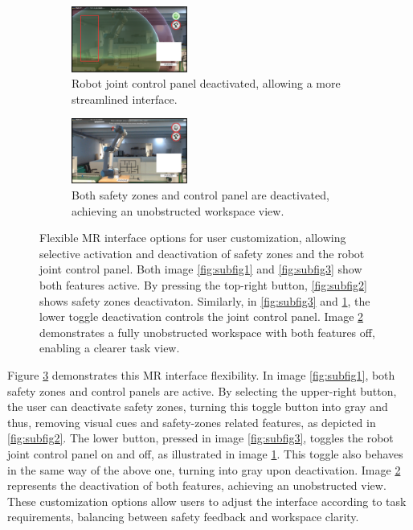 \begin{figure}[h]
    \vspace{0.5em}

    \begin{subfigure}{\textwidth}
        \centering
        \includegraphics[width=0.42\textwidth]{figs/feature-4.png}
        \caption{Robot joint control panel deactivated, allowing a more streamlined interface.}
        \label{fig:subfig4}
    \end{subfigure}

    \vspace{0.5em}

    \begin{subfigure}{\textwidth}
        \centering
        \includegraphics[width=0.42\textwidth]{figs/feature-5.png}
        \caption{Both safety zones and control panel are deactivated, achieving an unobstructed workspace view.}
        \label{fig:subfig5}
    \end{subfigure}

    \caption{Flexible \ac{MR} interface options for user customization, allowing selective activation and deactivation of safety zones and the robot joint control panel. Both image \ref{fig:subfig1} and \ref{fig:subfig3} show both features active. By pressing the top-right button, \ref{fig:subfig2} shows safety zones deactivaton. Similarly, in \ref{fig:subfig3} and \ref{fig:subfig4}, the lower toggle deactivation controls the joint control panel. Image \ref{fig:subfig5} demonstrates a fully unobstructed workspace with both features off, enabling a clearer task view.}
    \label{fig:all-features-button}
\end{figure}


Figure \ref{fig:all-features-button} demonstrates this \ac{MR} interface flexibility. In image \ref{fig:subfig1}, both safety zones and control panels are active. By selecting the upper-right button, the user can deactivate safety zones, turning this toggle button into gray and thus, removing visual cues and safety-zones related features, as depicted in \ref{fig:subfig2}. The lower button, pressed in image \ref{fig:subfig3}, toggles the robot joint control panel on and off, as illustrated in image \ref{fig:subfig4}. This toggle also behaves in the same way of the above one, turning into gray upon deactivation. Image \ref{fig:subfig5} represents the deactivation of both features, achieving an unobstructed view. These customization options allow users to adjust the interface according to task requirements, balancing between safety feedback and workspace clarity.

